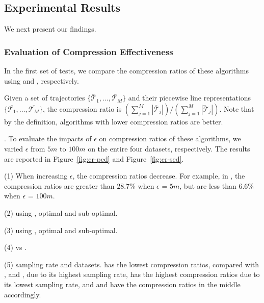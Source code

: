\subsection{Experimental Results}
We next present our findings.




\subsubsection{Evaluation of Compression Effectiveness}

In the first set of tests, we compare the compression ratios of these algorithms using \ped and \sed, respectively.


Given a set of trajectories $\{\dddot{\mathcal{T}_1}, \ldots, \dddot{\mathcal{T}_M}\}$ and their piecewise line representations
$\{\overline{\mathcal{T}_1}, \ldots, \overline{\mathcal{T}_M}\}$,
 the compression ratio is $(\sum_{j=1}^{M} |\overline{\mathcal{T}}_j |)/(\sum_{j=1}^{M} |\dddot{\mathcal{T}}_j |)$.
 Note that by the definition, algorithms with lower compression ratios are better.


.
To evaluate the impacts of $\epsilon$ on compression ratios of these algorithms, we varied $\epsilon$ from $5m$ to $100m$ on
 the entire four datasets, respectively.
The results are reported in Figure~\ref{fig:cr-ped} and Figure~\ref{fig:cr-sed}.

\sstab (1) When increasing $\epsilon$, the compression ratios decrease. For example, in \ucar,
the compression ratios are greater than $28.7\%$ when $\epsilon$ = $5m$, but are less than $6.6\%$ when $\epsilon$ = $100m$.

\sstab (2) using \ped, optimal and sub-optimal.

\sstab (3) using \sed, optimal and sub-optimal.

\sstab (4) \ped vs \sed.
	
\sstab (5) sampling rate and datasets.
\geolife has the lowest compression ratios, compared with \taxi, \truck and \ucar, due to its highest sampling rate, \taxi has the highest compression ratios due to its lowest sampling rate, and \truck and \ucar have the compression ratios in the middle accordingly.

